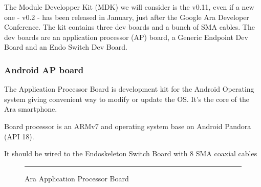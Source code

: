 The Module Developper Kit (MDK) we will consider is the v0.11, even if a new one - v0.2 - has been released in January, just after the Google Ara Developer Conference.
The kit contains three dev boards and a bunch of SMA cables. The dev boards are an application processor (AP) board, a Generic Endpoint Dev Board and an Endo Switch Dev Board.

\subsubsection{Android AP board}

The Application Processor Board is development kit for the Android Operating system giving convenient way to modify or update the OS. It's the core of the Ara smartphone.

Board processor is an ARMv7 and operating system base on Android Pandora (API 18).

It should be wired to the Endoskeleton Switch Board with 8 SMA coaxial cables


\begin{figure}[htbp]
  \centering
    \rule{35em}{0.5pt}
  \caption[Ara Application Processor Board]{Ara Application Processor Board}
  \label{fig:ap-board}
\end{figure}

